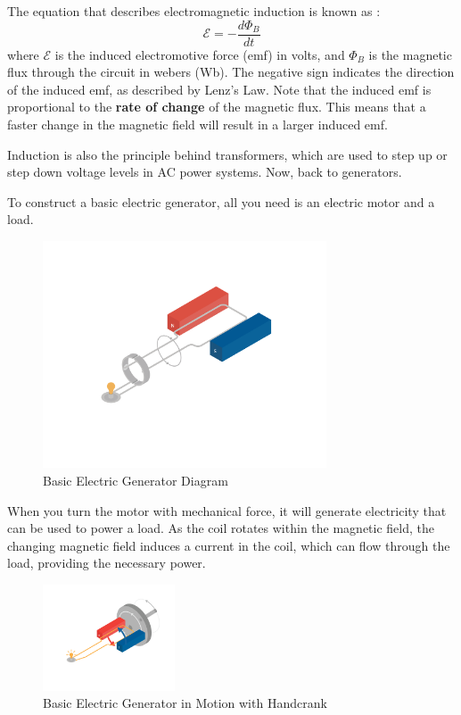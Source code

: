 The equation that describes electromagnetic induction is known as :
\begin{equation}
\mathcal{E} = -\frac{d\Phi_B}{dt}
\end{equation}
where $\mathcal{E}$ is the induced electromotive force (emf) in volts, and $\Phi_B$ is the magnetic 
flux through the circuit in webers (Wb). The negative sign indicates the direction of the induced emf, as described by Lenz's Law.
Note that the induced emf is proportional to the \textbf{rate of change} of the magnetic flux. This means that a faster change in the magnetic 
field will result in a larger induced emf.

Induction is also the principle behind transformers, which are used to step up or step down voltage levels in AC power systems. Now, back to generators.

To construct a basic electric generator, all you need is an electric motor and a load.
\begin{figure}[htbp]
    \centering
    \includegraphics[width=0.75\textwidth]{basicGenerator.png}
    \caption{Basic Electric Generator Diagram}
    \label{fig:basic-generator-diagram}
\end{figure}

\clearpage

When you turn the motor with mechanical force, it will generate electricity that can be used to power a load. As the coil rotates within the 
magnetic field, the changing magnetic field induces a current in the coil, which can flow through the load, providing the necessary power. 

\begin{figure}[htbp]
    \centering
    \includegraphics[width=0.35\textwidth]{basicGeneratorCrank.png}
    \caption{Basic Electric Generator in Motion with Handcrank}
    \label{fig:basic-generator-w-crank}
\end{figure}

